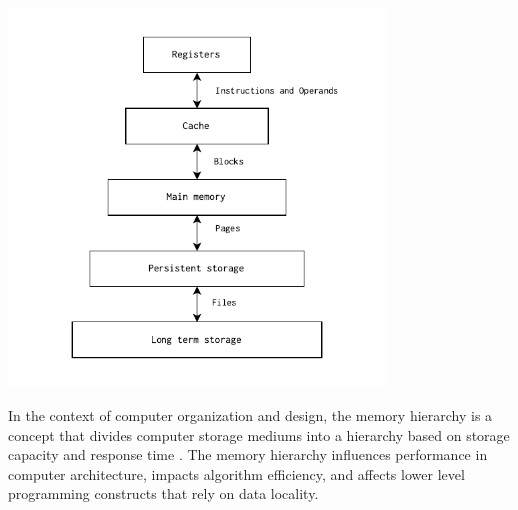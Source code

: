 \begin{center}
	\centering
	\includegraphics[width=0.75\textwidth]{figures/02-background/memhier.pdf}
	\label{fig:memhier}
\end{center}


\noindent In the context of computer organization and design, the memory hierarchy is a concept that divides computer storage mediums into a hierarchy based on storage capacity and response time
\cite{oldbooksmarthead}. The memory hierarchy influences performance in computer architecture,
impacts algorithm efficiency, and affects lower level programming constructs that rely on data locality.

